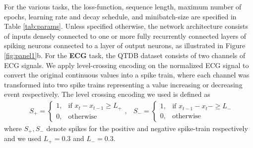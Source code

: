 \documentclass[fleqn,10pt]{wlscirep}
\begin{document}
For the various tasks, the loss-function, sequence length, maximum number of epochs, learning rate and decay schedule, and minibatch-size are specified in Table \ref{tab:params}. Unless specified otherwise, the network architecture consists of inputs densely connected to one or more fully recurrently connected layers of spiking neurons connected to a layer of output neurons, as illustrated in Figure \ref{fig:panel1}b. For the {\bf ECG} task, the QTDB dataset \cite{laguna1997database} consists of two channels of ECG signals. We apply level-crossing encoding \cite{lichtsteiner2008128} on the normalized ECG signal to convert the original continuous values into a spike train, where each channel was transformed into two spike trains representing a value increasing or decreasing event respectively. The level crossing encoding we used is defined as 
\begin{align*}
&S_{+} = 
\begin{cases}
    1,& \text{if } x_t-x_{t-1}\geq L_{+}\\
    0,              & \text{otherwise}
\end{cases}, 
&S_{-} = 
\begin{cases}
    1,& \text{if } x_{t-1}-x_t-\geq L_{-}\\
    0,              & \text{otherwise}
\end{cases}
\end{align*}
where $S_{+},S_{-}$ denote spikes for the positive and negative spike-train respectively and we used $L_{+} = 0.3$ and $L_{-} = 0.3$. 
\end{document}
